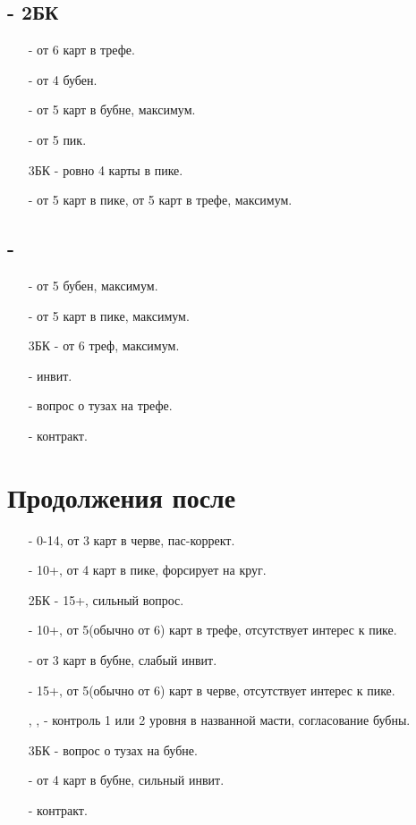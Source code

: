 \documentclass{article}
\begin{document}
\subsection{ - 2БК}
\begin{enumerate}
    \item[\cl{3}] - от 6 карт в трефе.
    \item[\di{3}] - от 4 бубен.
    \item[\he{3}] - от 5 карт в бубне, максимум.
    \item[\sp{3}] - от 5 пик.
    \item[3БК] - ровно 4 карты в пике.
    \item[\cl{4}] - от 5 карт в пике, от 5 карт в трефе, максимум.
\end{enumerate}
\subsection{ - }
\begin{enumerate}
    \item[\di{3}] - от 5 бубен, максимум.
    \item[\sp{3}] - от 5 карт в пике, максимум.
    \item[3БК] - от 6 треф, максимум.
    \item[\cl{4}] - инвит.
    \item[\di{4}] - вопрос о тузах на трефе.
    \item[\cl{5}] - контракт.
\end{enumerate}
\section{Продолжения после }
\begin{enumerate}
    \item[\he{2}] - 0-14, от 3 карт в черве, пас-коррект.
    \item[\sp{2}] - 10+, от 4 карт в пике, форсирует на круг.
    \item[2БК] - 15+, сильный вопрос.
    \item[\cl{3}] - 10+, от 5(обычно от 6) карт в трефе, отсутствует интерес к пике. 
    \item[\di{3}] - от 3 карт в бубне, слабый инвит.
    \item[\he{3}] - 15+, от 5(обычно от 6) карт в черве, отсутствует интерес к пике. 
    \item[\sp{3}, \cl{4}, \he{4}] - контроль 1 или 2 уровня в названной масти, согласование бубны.
    \item[3БК] - вопрос о тузах на бубне.
    \item[\di{4}] - от 4 карт в бубне, сильный инвит.
    \item[\di{5}] - контракт.
\end{enumerate}
\end{document}
